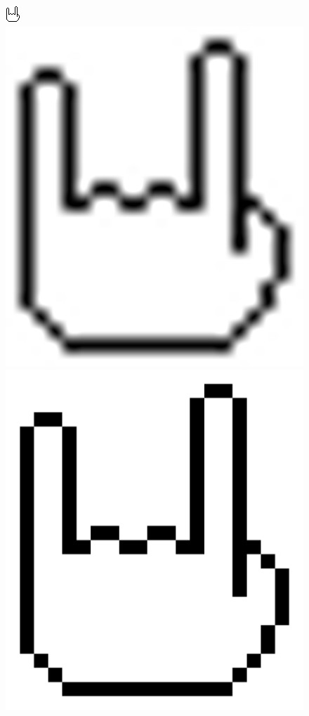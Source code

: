 \begin{figure}
  \includegraphics[]{images/pixelart-original.png}
  \includegraphics[width=\columnwidth/100*46]{images/pixelart-scaled-bad.png}
  \includegraphics[width=\columnwidth/100*46]{images/pixelart-scaled-good.png}


\end{figure}
